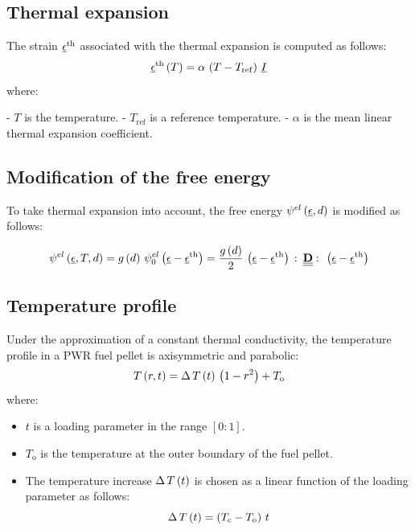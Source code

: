 \subsection{Thermal expansion}

The strain \(\underline{\epsilon}^{\mathrm{th}}\) associated with the thermal expansion is
computed as follows:
\[
\underline{\epsilon}^{\mathrm{th}}\left(T\right)=\alpha\,\left(T-T_{\mathrm{ref}}\right)\,\underline{I}
\]
where:

- \(T\) is the temperature.
- \(T_{\mathrm{ref}}\) is a reference temperature.
- \(\alpha\) is the mean linear thermal expansion coefficient.

\subsection{Modification of the free energy}

To take thermal expansion into account, the free energy
\({\psi}^{el}\left(\underline{\epsilon}, d\right)\) is modified as follows:

\begin{equation}
  \label{eq:micromorphicdamage:freeenergygel_th}
  {\psi}^{el}\left(\underline{\epsilon}, T, d\right) = 
  g\left(d\right)\,{\psi}^{el}_{0}\left(\underline{\epsilon}-\underline{\epsilon}^{\mathrm{th}}\right) =
  \displaystyle \frac{\displaystyle g\left(d\right)}{\displaystyle 2}\,\left(\underline{\epsilon}-\underline{\epsilon}^{\mathrm{th}}\right)\,\colon\,\underline{\underline{\mathbf{D}}}\,\colon\,\left(\underline{\epsilon}-\underline{\epsilon}^{\mathrm{th}}\right)
\end{equation}


\subsection{Temperature profile}

Under the approximation of a constant thermal conductivity, the
temperature profile in a PWR fuel pellet is axisymmetric and parabolic:
\[
T\left(r, t\right)=\Delta\,T\left(t\right)\,\left(1-r^{2}\right)+T_{\mathrm{o}}
\]
where:

\begin{itemize}
  \item \(t\) is a loading parameter in the range \([0:1]\).
  \item \(T_{\mathrm{o}}\) is the temperature at the outer boundary of the
    fuel pellet.
  \item The temperature increase \(\Delta\,T\left(t\right)\) is chosen as a linear
    function of the loading parameter as follows:
    \[
    \Delta\,T\left(t\right) = \left(T_{\mathrm{c}}-T_{\mathrm{o}}\right)\, t
    \]
\end{itemize}

